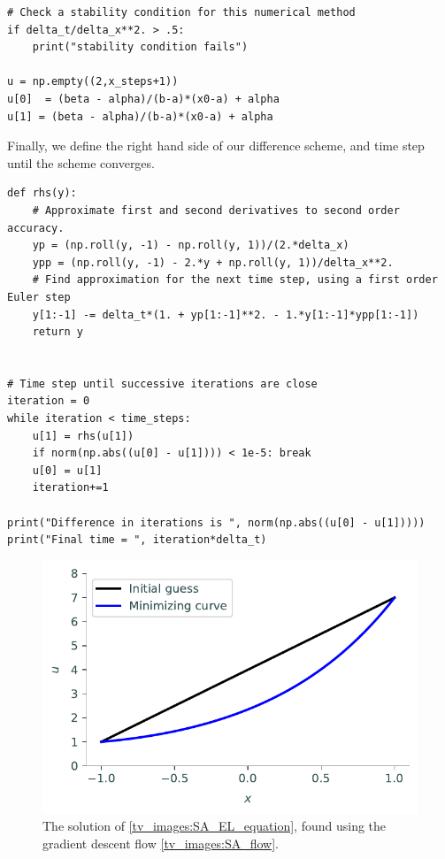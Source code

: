 \begin{lstlisting}
# Check a stability condition for this numerical method
if delta_t/delta_x**2. > .5:
    print("stability condition fails")

u = np.empty((2,x_steps+1))
u[0]  = (beta - alpha)/(b-a)*(x0-a) + alpha
u[1] = (beta - alpha)/(b-a)*(x0-a) + alpha
\end{lstlisting}

Finally, we define the right hand side of our difference scheme, and time step until the scheme converges.
\begin{lstlisting}
def rhs(y):
    # Approximate first and second derivatives to second order accuracy.
    yp = (np.roll(y, -1) - np.roll(y, 1))/(2.*delta_x)
    ypp = (np.roll(y, -1) - 2.*y + np.roll(y, 1))/delta_x**2.
    # Find approximation for the next time step, using a first order Euler step
    y[1:-1] -= delta_t*(1. + yp[1:-1]**2. - 1.*y[1:-1]*ypp[1:-1])
    return y


# Time step until successive iterations are close
iteration = 0
while iteration < time_steps:
    u[1] = rhs(u[1])
    if norm(np.abs((u[0] - u[1]))) < 1e-5: break
    u[0] = u[1]
    iteration+=1

print("Difference in iterations is ", norm(np.abs((u[0] - u[1]))))
print("Final time = ", iteration*delta_t)
\end{lstlisting}

\begin{figure}
\centering
\includegraphics[width=\textwidth]{figures/min_surface_area.pdf}
\caption{The solution of \eqref{tv_images:SA_EL_equation}, found using the gradient descent flow \eqref{tv_images:SA_flow}.}
\label{fig:tv_images:SA_image}
\end{figure}

